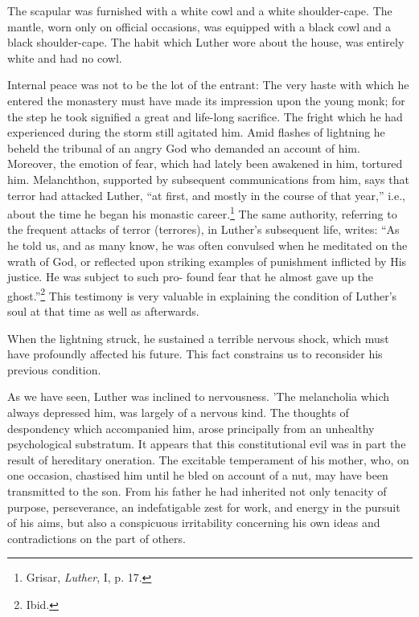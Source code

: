 The scapular was furnished with a white cowl and a white shoulder-cape. The mantle, worn only on official occasions, was equipped with
a black cowl and a black shoulder-cape. The habit which Luther
wore about the house, was entirely white and had no cowl.

Internal peace was not to be the lot of the entrant: The very haste
with which he entered the monastery must have made its impression
upon the young monk; for the step he took signified a great and
life-long sacrifice. The fright which he had experienced during the
storm still agitated him. Amid flashes of lightning he beheld the
tribunal of an angry God who demanded an account of him. Moreover,
the emotion of fear, which had lately been awakened in him,
tortured him. Melanchthon, supported by subsequent communications
from him, says that terror had attacked Luther, “at first, and
mostly in the course of that year,” i.e., about the time he began his monastic career.\footnote
{Grisar, \textit{Luther}, I, p. 17.}
The same authority, referring to the frequent attacks of terror (terrores), in Luther’s
subsequent life, writes: “As he told us, and as many know, he was often convulsed when he meditated on the wrath of God, or reflected upon striking examples of punishment inflicted by His justice. He was subject to such pro- found fear that he almost gave up the ghost.”\footnote{Ibid.}
This testimony is very valuable in explaining the condition of Luther’s soul at that time as well as afterwards.

When the lightning struck, he sustained a terrible nervous shock, which must have profoundly affected his future.
This fact constrains us to reconsider his previous condition.

As we have seen, Luther was inclined to nervousness. 'The melancholia
which always depressed him, was largely of a nervous kind. The thoughts
of despondency which accompanied him, arose principally from an unhealthy
psychological substratum. It appears that this constitutional evil was
in part the result of hereditary oneration. The excitable temperament of
his mother, who, on one occasion, chastised him until he bled on account of a nut, may have
been transmitted to the son. From his father he had inherited not
only tenacity of purpose, perseverance, an indefatigable zest for
work, and energy in the pursuit of his aims, but also a conspicuous
irritability concerning his own ideas and contradictions on the part
of others.

